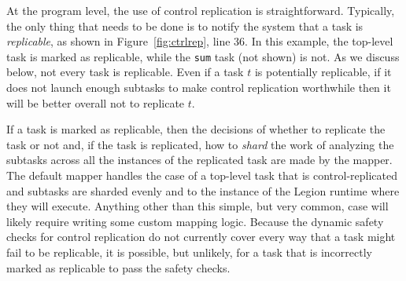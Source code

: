At the program level, the use of control replication is straightforward.  Typically,
the only thing that needs to be done is to notify the system that a task is {\em replicable},
as shown in Figure~\ref{fig:ctrlrep}, line 36.  In this example, the top-level
task is marked as replicable, while the {\tt sum} task (not shown) is not.
As we discuss below, not every task is replicable.  Even if a task $t$ is potentially
replicable, if it does not launch enough subtasks to make control replication
worthwhile then it will be better overall not to replicate $t$.

If a task is marked as replicable, then the decisions of whether to
replicate the task or not and, if the task is replicated, how to {\em
  shard} the work of analyzing the subtasks across all the instances
of the replicated task are made by the mapper.  The default mapper
handles the case of a top-level task that is control-replicated and
subtasks are sharded evenly and to the instance of the Legion runtime
where they will execute.  Anything other than this simple, but very
common, case will likely require writing some custom mapping
logic.  Because the dynamic safety checks for control
replication do not currently cover every way that a task
might fail to be replicable, it is possible, but unlikely, for a task that is
incorrectly marked as replicable to pass the safety checks.


    
